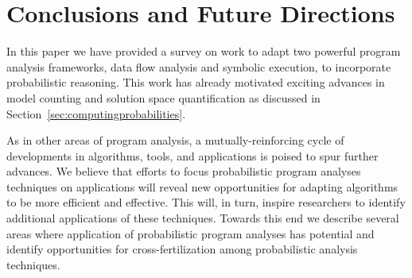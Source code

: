 \section{Conclusions and Future Directions}
\label{sec:future}

In this paper we have provided a survey on work to adapt two
powerful program analysis frameworks, data flow analysis and symbolic
execution, to incorporate probabilistic reasoning.  This work has
already motivated exciting advances in model counting and solution
space quantification as discussed in Section~\ref{sec:computingprobabilities}.

As in other areas of program analysis, a mutually-reinforcing cycle of
developments in algorithms, tools, and applications
is poised to spur further advances.  We believe that efforts to focus
probabilistic program analyses techniques on applications will reveal
new opportunities for adapting algorithms to be more efficient and
effective. This will, in turn, inspire researchers to identify
additional applications of these techniques.   Towards this end we
describe several areas where application of probabilistic program
analyses has potential and identify opportunities for cross-fertilization
among probabilistic analysis techniques.

